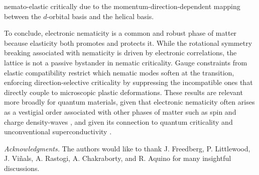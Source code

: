 \documentclass[aps,prb, twocolumn, superscriptaddress, amsmath, amsfonts, amssymb, amsthm]{revtex4-2}
\begin{document}
nemato-elastic critically due to the momentum-direction-dependent mapping between the $d$-orbital basis and the helical basis.

To conclude, electronic nematicity is a common and robust phase of matter because elasticity both promotes and protects it. While the rotational symmetry breaking associated with nematicity is driven by electronic correlations, the lattice is not a passive bystander in nematic criticality. Gauge constraints from elastic compatibility restrict which nematic modes soften at the transition, enforcing direction-selective criticality by suppressing the incompatible ones that directly couple to microscopic plastic deformations. These results are relevant more broadly for quantum materials, given that electronic nematicity often arises as a vestigial order associated with other phases of matter such as spin and charge density-waves \cite{Fradkin2019,Fernandes2019}, and given its connection to quantum criticality and unconventional superconductivity \cite{Lederer2015,Lederer2017,Klein2018}.

\textit{Acknowledgments.} The authors would like to thank J. Freedberg, P. Littlewood, J. Vi\~nals, A. Rastogi, A. Chakraborty, and R. Aquino for many insightful discussions.

 
\end{document}
